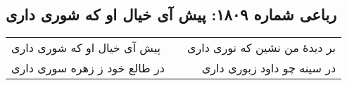 \begin{center}
\section*{رباعی شماره ۱۸۰۹: پیش آی خیال او که شوری داری}
\label{sec:1809}
\begin{longtable}{l p{0.5cm} r}
پیش آی خیال او که شوری داری
&&
بر دیدهٔ من نشین که نوری داری
\\
در طالع خود ز زهره سوری داری
&&
در سینه چو داود زبوری داری
\\
\end{longtable}
\end{center}
